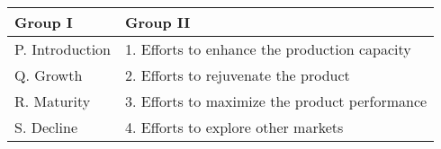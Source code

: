 \begin{center}
\begin{tabular}{|l|l|}
\hline
\textbf{Group I} & \textbf{Group II} \\
\hline
P. Introduction & 1. Efforts to enhance the production capacity \\ \hline
Q. Growth & 2. Efforts to rejuvenate the product \\ \hline
R. Maturity & 3. Efforts to maximize the product performance \\  \hline
S. Decline & 4. Efforts to explore other markets \\  \hline

\end{tabular}
\end{center}